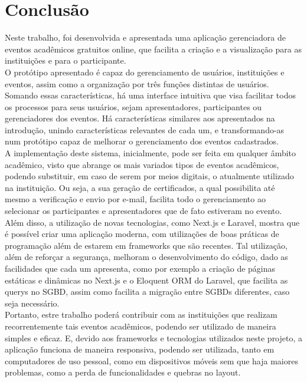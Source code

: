 \chapter{Conclusão}\label{chp:LABEL_CHP_6}

Neste trabalho, foi desenvolvida e apresentada uma aplicação gerenciadora de eventos acadêmicos gratuitos online, que facilita a criação e a visualização para as instituições e para o participante.\\
O protótipo apresentado é capaz do gerenciamento de usuários, instituições e eventos, assim como a organização por três funções distintas de usuários. Somando essas características, há uma interface intuitiva que visa facilitar todos os processos para seus usuários, sejam apresentadores, participantes ou gerenciadores dos eventos. Há características similares aos apresentados na introdução, unindo características relevantes de cada um, e transformando-as num protótipo capaz de melhorar o gerenciamento dos eventos cadastrados.\\
A implementação deste sistema, inicialmente, pode ser feita em qualquer âmbito acadêmico, visto que abrange os mais variados tipos de eventos acadêmicos, podendo substituir, em caso de serem por meios digitais, o atualmente utilizado na instituição. Ou seja, a sua geração de certificados, a qual possibilita até mesmo a verificação e envio por e-mail, facilita todo o gerenciamento ao selecionar os participantes e apresentadores que de fato estiveram no evento.\\
Além disso, a utilização de novas tecnologias, como Next.js e Laravel, mostra que é possível criar uma aplicação moderna, com utilizações de boas práticas de programação além de estarem em frameworks que são recentes. Tal utilização, além de reforçar a segurança, melhoram o desenvolvimento do código, dado as facilidades que cada um apresenta, como por exemplo a criação de páginas estáticas e dinâmicas no Next.js e o Eloquent ORM do Laravel, que facilita as querys no SGBD, assim como facilita a migração entre SGBDs diferentes, caso seja necessário.\\
Portanto, estre trabalho poderá contribuir com as instituições que realizam recorrentemente tais eventos acadêmicos, podendo ser utilizado de maneira simples e eficaz.  E, devido aos frameworks e tecnologias utilizados neste projeto, a aplicação funciona de maneira responsiva, podendo ser utilizada, tanto em computadores de uso pessoal, como em dispositivos móveis sem que haja maiores problemas, como a perda de funcionalidades e quebras no layout.



